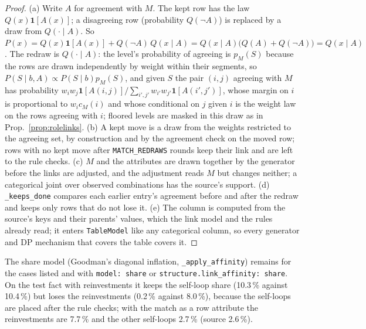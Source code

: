 \begin{proof}
(a) Write $A$ for agreement with $M$. The kept row has the law $Q(x)\mathbf 1[A(x)]$; a disagreeing row (probability $Q(\neg A)$) is replaced by a draw from $Q(\cdot\mid A)$. So $P(x)=Q(x)\mathbf 1[A(x)]+Q(\neg A)\,Q(x\mid A)=Q(x\mid A)\big(Q(A)+Q(\neg A)\big)=Q(x\mid A)$. The redraw is $Q(\cdot\mid A)$: the level's probability of agreeing is $p_M(S)$ because the rows are drawn independently by weight within their segments, so $P(S\mid b,A)\propto P(S\mid b)p_M(S)$, and given $S$ the pair $(i,j)$ agreeing with $M$ has probability $w_iw_j\mathbf 1[A(i,j)]/\sum_{i',j'}w_{i'}w_{j'}\mathbf 1[A(i',j')]$, whose margin on $i$ is proportional to $w_ic_M(i)$ and whose conditional on $j$ given $i$ is the weight law on the rows agreeing with $i$; floored levels are masked in this draw as in Prop.~\ref{prop:rolelinks}. (b) A kept move is a draw from the weights restricted to the agreeing set, by construction and by the agreement check on the moved row; rows with no kept move after \texttt{MATCH\_REDRAWS} rounds keep their link and are left to the rule checks. (c) $M$ and the attributes are drawn together by the generator before the links are adjusted, and the adjustment reads $M$ but changes neither; a categorical joint over observed combinations has the source's support. (d) \texttt{\_keeps\_done} compares each earlier entry's agreement before and after the redraw and keeps only rows that do not lose it. (e) The column is computed from the source's keys and their parents' values, which the link model and the rules already read; it enters \texttt{TableModel} like any categorical column, so every generator and DP mechanism that covers the table covers it.
\end{proof}
\noindent The share model (Goodman's diagonal inflation, \texttt{\_apply\_affinity}) remains for the cases listed and with \texttt{model: share} or \texttt{structure.link\_affinity: share}. On the test fact with reinvestments it keeps the self-loop share (10.3\,\% against 10.4\,\%) but loses the reinvestments (0.2\,\% against 8.0\,\%), because the self-loops are placed after the rule checks; with the match as a row attribute the reinvestments are 7.7\,\% and the other self-loops 2.7\,\% (source 2.6\,\%).

\setcounter{proposition}{\value{savedproprole}}
